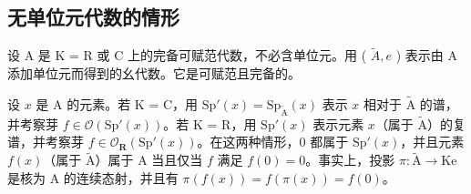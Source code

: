 \subsection{无单位元代数的情形}

设 A 是 K = R 或 C 上的完备可赋范代数，不必含单位元。用 ( \(\widetilde{A}, e\) ) 表示由 A 添加单位元而得到的幺代数。它是可赋范且完备的。

设 \(x\) 是 A 的元素。若 K = C，用 \(\mathrm{Sp}'(x) = \mathrm{Sp}_{\widetilde{\mathrm{A}}} (x)\) 表示 \(x\) 相对于 \(\widetilde{\mathrm{A}}\) 的谱，并考察芽 \(f \in \mathcal{O}(\mathrm{Sp}'(x))\)。若 K = R，用 \(\mathrm{Sp}'(x)\) 表示元素 \(x\)（属于 \(\widetilde{\mathrm{A}}\)）的复谱，并考察芽 \(f \in \mathcal{O}_{\mathbf{R}}(\mathrm{Sp}'(x))\)。在这两种情形，0 都属于 \(\mathrm{Sp}'(x)\)，并且元素 \(f(x)\)（属于 \(\widetilde{\mathrm{A}}\)）属于 A 当且仅当 \(f\) 满足 \(f(0) = 0\)。事实上，投影 \(\pi: \widetilde{\mathrm{A}} \to \mathrm{Ke}\) 是核为 A 的连续态射，并且有 \(\pi(f(x)) = f(\pi(x)) = f(0)\)。

